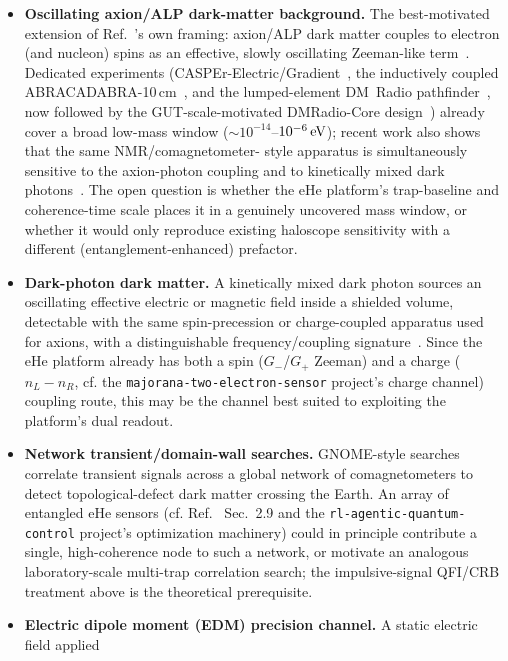 \documentclass[aps,prxquantum,reprint,superscriptaddress,longbibliography]{revtex4-2}
\begin{document}
\begin{itemize}
  \item \textbf{Oscillating axion/ALP dark-matter background.} The best-motivated extension of
  Ref.~\cite{perruzza2026}'s own framing: axion/ALP dark matter couples to electron (and nucleon)
  spins as an effective, slowly oscillating Zeeman-like term~\cite{graham2013new,abel2017search}.
  Dedicated experiments (CASPEr-Electric/Gradient~\cite{budker2014proposal}, the inductively coupled
  ABRACADABRA-10\,cm~\cite{ouellet2019design,salemi2021search}, and the lumped-element DM~Radio
  pathfinder~\cite{silvafeaver2017design}, now followed by the GUT-scale-motivated
  DMRadio-Core design~\cite{ankel2026dmradiocore}) already cover a broad low-mass window
  ($\sim 10^{-14}$--$10^{-6}\,{\rm eV}$); recent work also shows that the same NMR/comagnetometer-
  style apparatus is simultaneously sensitive to the axion-photon coupling and to kinetically mixed
  dark photons~\cite{beadle2025nmr}. The open question is whether the eHe platform's trap-baseline
  and coherence-time scale places it in a genuinely uncovered mass window, or whether it would only
  reproduce existing haloscope sensitivity with a different (entanglement-enhanced) prefactor.
  \item \textbf{Dark-photon dark matter.} A kinetically mixed dark photon sources an oscillating
  effective electric or magnetic field inside a shielded volume, detectable with the same
  spin-precession or charge-coupled apparatus used for axions, with a
  distinguishable frequency/coupling signature~\cite{beadle2025nmr}. Since the eHe platform already
  has both a spin ($G_-$/$G_+$ Zeeman) and a charge ($n_L - n_R$, cf. the
  \texttt{majorana-two-electron-sensor} project's charge channel) coupling route, this may be the
  channel best suited to exploiting the platform's dual readout.
  \item \textbf{Network transient/domain-wall searches.} GNOME-style
  searches~\cite{afach2021search,afach2023gnome} correlate transient signals across a global network
  of comagnetometers to detect topological-defect dark matter crossing the Earth. An array of
  entangled eHe sensors (cf. Ref.~\cite{perruzza2026} Sec.~2.9 and the
  \texttt{rl-agentic-quantum-control} project's optimization machinery) could in principle contribute
  a single, high-coherence node to such a network, or motivate an analogous laboratory-scale
  multi-trap correlation search; the impulsive-signal QFI/CRB treatment above is the theoretical
  prerequisite.
  \item \textbf{Electric dipole moment (EDM) precision channel.} A static electric field applied

\end{itemize}
\end{document}
